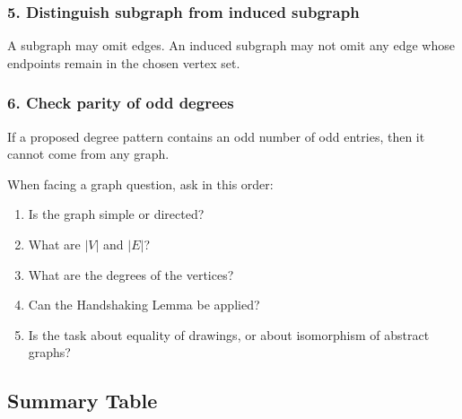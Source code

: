\subsubsection*{5. Distinguish subgraph from induced subgraph}
A subgraph may omit edges. An induced subgraph may not omit any edge whose endpoints remain in the chosen vertex set.

\subsubsection*{6. Check parity of odd degrees}
If a proposed degree pattern contains an odd number of odd entries, then it cannot come from any graph.

\begin{examtip}[title={Fast diagnostic summary}]
When facing a graph question, ask in this order:
\begin{enumerate}[leftmargin=*]
    \item Is the graph simple or directed?
    \item What are \(|V|\) and \(|E|\)?
    \item What are the degrees of the vertices?
    \item Can the Handshaking Lemma be applied?
    \item Is the task about equality of drawings, or about isomorphism of abstract graphs?
\end{enumerate}
\end{examtip}

\subsection{Summary Table}

